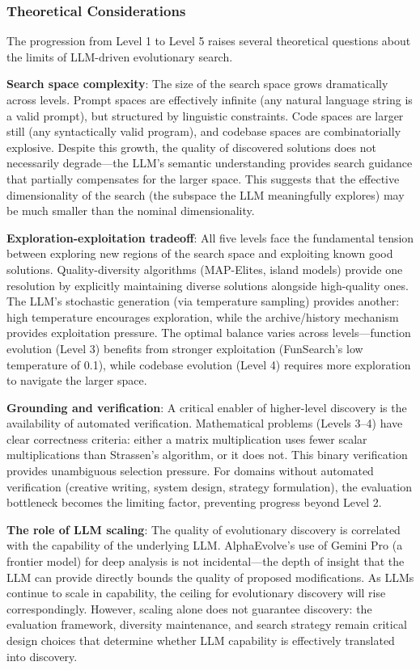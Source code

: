 \subsubsection{Theoretical Considerations}

The progression from Level 1 to Level 5 raises several theoretical questions about the limits of LLM-driven evolutionary search.

\textbf{Search space complexity}: The size of the search space grows dramatically across levels. Prompt spaces are effectively infinite (any natural language string is a valid prompt), but structured by linguistic constraints. Code spaces are larger still (any syntactically valid program), and codebase spaces are combinatorially explosive. Despite this growth, the quality of discovered solutions does not necessarily degrade---the LLM's semantic understanding provides search guidance that partially compensates for the larger space. This suggests that the effective dimensionality of the search (the subspace the LLM meaningfully explores) may be much smaller than the nominal dimensionality.

\textbf{Exploration-exploitation tradeoff}: All five levels face the fundamental tension between exploring new regions of the search space and exploiting known good solutions. Quality-diversity algorithms (MAP-Elites, island models) provide one resolution by explicitly maintaining diverse solutions alongside high-quality ones. The LLM's stochastic generation (via temperature sampling) provides another: high temperature encourages exploration, while the archive/history mechanism provides exploitation pressure. The optimal balance varies across levels---function evolution (Level 3) benefits from stronger exploitation (FunSearch's low temperature of 0.1), while codebase evolution (Level 4) requires more exploration to navigate the larger space.

\textbf{Grounding and verification}: A critical enabler of higher-level discovery is the availability of automated verification. Mathematical problems (Levels 3--4) have clear correctness criteria: either a matrix multiplication uses fewer scalar multiplications than Strassen's algorithm, or it does not. This binary verification provides unambiguous selection pressure. For domains without automated verification (creative writing, system design, strategy formulation), the evaluation bottleneck becomes the limiting factor, preventing progress beyond Level 2.

\textbf{The role of LLM scaling}: The quality of evolutionary discovery is correlated with the capability of the underlying LLM. AlphaEvolve's use of Gemini Pro (a frontier model) for deep analysis is not incidental---the depth of insight that the LLM can provide directly bounds the quality of proposed modifications. As LLMs continue to scale in capability, the ceiling for evolutionary discovery will rise correspondingly. However, scaling alone does not guarantee discovery: the evaluation framework, diversity maintenance, and search strategy remain critical design choices that determine whether LLM capability is effectively translated into discovery.

